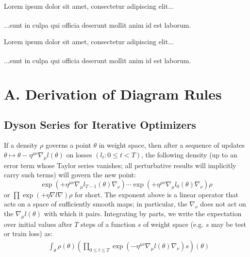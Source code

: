 \documentclass{article}
\newcommand{\lorem}[1]{
    Lorem ipsum dolor sit amet, consectetur adipiscing elit...\\
    \nopagebreak\vspace{#1cm} \ \\
    ...sunt in culpa qui officia deserunt mollit anim id est laborum.
}
\begin{document}
    
    

    \lorem{3}
    \lorem{3}


\section*{A. Derivation of Diagram Rules}

\subsection{Dyson Series for Iterative Optimizers}
    If a density $\rho$ governs a point $\theta$ in weight space, then after a
    sequence of updates $\theta \mapsto \theta - \eta^{\mu\nu} \nabla_\mu
    l(\theta)$ on losses $(l_t: 0\leq t < T)$, the following density (up to an
    error term whose Taylor series vanishes; all perturbative results will
    implicitly carry such terms) will govern the new point:
    \begin{equation}\label{eq:descexp}
        \exp\left(+\eta^{\mu\nu} \nabla_\mu l_{T-1}(\theta) \nabla_\nu\right) \cdots \exp\left(+\eta^{\mu\nu} \nabla_\mu l_0(\theta) \nabla_\nu\right) \rho
    \end{equation}
    or
    $
        \prod \exp\left(+\eta \nabla l \nabla\right) \rho
    $
    for short.
    The exponent above is a linear operator that acts on a space of
    sufficiently smooth maps; in particular, the $\nabla_\nu$ does not act on
    the $\nabla_\mu l(\theta)$ with which it pairs.  Integrating by parts, we
    write the expectation over initial values after $T$ steps of a function $s$
    of weight space (e.g. $s$ may be test or train loss) as:
    \begin{align}\label{eq:contraexp}
        &\int_\theta \rho(\theta) \left(\prod_{0 \leq t \leq T} \exp\left(-\eta^{\mu\nu} \nabla_\mu l(\theta) \nabla_\nu\right) s\right)(\theta)
    \end{align}
\end{document}
